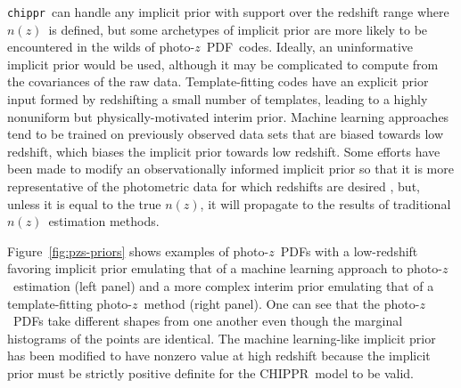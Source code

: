 \documentclass[iop]{emulateapj}
\newcommand{\todo}[3]{{\color{#2}\emph{#1}: #3}}
\newcommand{\aim}[1]{\todo{AIM}{red}{#1}}
\newcommand{\Fig}[1]{Figure~\ref{#1}}
\newcommand{\project}[1]{\textsc{#1}}
\newcommand{\Chippr}{\project{CHIPPR}}%
\newcommand{\repo}[1]{\texttt{#1}}
\newcommand{\chippr}{\repo{chippr}}
\newcommand{\pz}{photo-$z$}
\newcommand{\pzpdf}{\pz\ PDF}%
\newcommand{\nz}{$n(z)$}
\begin{document}
\chippr\ can handle any implicit prior with support over the redshift range where \nz\ is defined, but some archetypes of implicit prior are more likely to be encountered in the wilds of \pzpdf\ codes.
Ideally, an uninformative implicit prior would be used, although it may be complicated to compute from the covariances of the raw data.  
Template-fitting codes have an explicit prior input formed by redshifting a small number of templates, leading to a highly nonuniform but physically-motivated interim prior.
Machine learning approaches tend to be trained on previously observed data sets that are biased towards low redshift, which biases the implicit prior towards low redshift.
Some efforts have been made to modify an observationally informed implicit prior so that it is more representative of the photometric data for which redshifts are desired \citep{sheldon_photometric_2012}, but, unless it is equal to the true \nz, it will propagate to the results of traditional \nz\ estimation methods.  

\Fig{fig:pzs-priors} shows examples of \pzpdf s with a low-redshift favoring implicit prior emulating that of a machine learning approach to \pz\ estimation (left panel) and a more complex interim prior emulating that of a template-fitting \pz\ method (right panel).
One can see that the \pzpdf s take different shapes from one another even though the marginal histograms of the points are identical.
The machine learning-like implicit prior has been modified to have nonzero value at high redshift because the implicit prior must be strictly positive definite for the \Chippr\ model to be valid.
\end{document}
